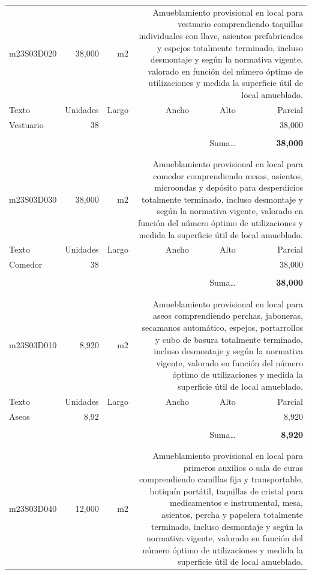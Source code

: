 \documentclass{book}%
\begin{document}
\begin{longtable}{lrrrrr}
m23S03D020&    38,000& m2&\multicolumn{3}{p{6cm}}{\scriptsize Amueblamiento provisional en local para vestuario comprendiendo taquillas individuales con llave, asientos prefabricados y espejos totalmente terminado, incluso desmontaje y según la normativa vigente, valorado en función del número óptimo de utilizaciones y medida la superficie útil de local amueblado.\normalsize}\\%
Texto&Unidades&Largo&Ancho&Alto&Parcial\\%
\hline%
\multicolumn{1}{p{3.5cm}}{Vestuario}&38&&&&    38,000\\%
&&&&&\\%
\multicolumn{5}{r}{Suma\ldots}&\textbf{    38,000}\\%
\hline%
&&&&&\\%
&&&&&\\%
m23S03D030&    38,000& m2&\multicolumn{3}{p{6cm}}{\scriptsize Amueblamiento provisional en local para comedor comprendiendo mesas, asientos, microondas y depósito para desperdicios totalmente terminado, incluso desmontaje y según la normativa vigente, valorado en función del número óptimo de utilizaciones y medida la superficie útil de local amueblado.\normalsize}\\%
Texto&Unidades&Largo&Ancho&Alto&Parcial\\%
\hline%
\multicolumn{1}{p{3.5cm}}{Comedor}&38&&&&    38,000\\%
&&&&&\\%
\multicolumn{5}{r}{Suma\ldots}&\textbf{    38,000}\\%
\hline%
&&&&&\\%
&&&&&\\%
m23S03D010&     8,920& m2&\multicolumn{3}{p{6cm}}{\scriptsize Amueblamiento provisional en local para aseos comprendiendo perchas, jaboneras, secamanos automático, espejos, portarrollos y cubo de basura totalmente terminado, incluso desmontaje y según la normativa vigente, valorado en función del número óptimo de utilizaciones y medida la superficie útil de local amueblado.\normalsize}\\%
Texto&Unidades&Largo&Ancho&Alto&Parcial\\%
\hline%
\multicolumn{1}{p{3.5cm}}{Aseos}&8,92&&&&     8,920\\%
&&&&&\\%
\multicolumn{5}{r}{Suma\ldots}&\textbf{     8,920}\\%
\hline%
&&&&&\\%
&&&&&\\%
m23S03D040&    12,000& m2&\multicolumn{3}{p{6cm}}{\scriptsize Amueblamiento provisional en local para primeros auxilios o sala de curas comprendiendo camillas fija y transportable, botiquín portátil, taquillas de cristal para medicamentos e instrumental, mesa, asientos, percha y papelera totalmente terminado, incluso desmontaje y según la normativa vigente, valorado en función del número óptimo de utilizaciones y medida la superficie útil de local amueblado.\normalsize}\\%

\end{longtable}
\end{document}
